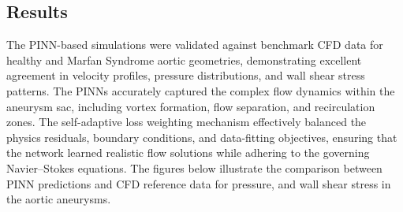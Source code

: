 \documentclass[12pt, a4paper]{article}
\begin{document}
\subsection{Results}
\label{sec:PINN_Results}

The PINN-based simulations were validated against benchmark CFD data for healthy and Marfan Syndrome aortic geometries, demonstrating excellent agreement in velocity profiles, pressure distributions, and wall shear stress patterns. The PINNs accurately captured the complex flow dynamics within the aneurysm sac, including vortex formation, flow separation, and recirculation zones. The self-adaptive loss weighting mechanism effectively balanced the physics residuals, boundary conditions, and data-fitting objectives, ensuring that the network learned realistic flow solutions while adhering to the governing Navier--Stokes equations. The figures below illustrate the comparison between PINN predictions and CFD reference data for pressure, and wall shear stress in the aortic aneurysms. 
\end{document}
